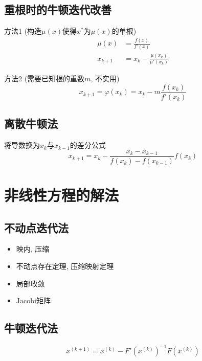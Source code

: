 \documentclass[twoside]{article}
\begin{document}
\subsection{重根时的牛顿迭代改善}
方法1 (构造$\mu(x)$使得$x^*$为$\mu(x)$的单根)
\begin{equation*}
  \begin{aligned}
    \mu(x) &= \frac{f(x)}{f'(x)} \\
    x_{k+1} &= x_k - \frac{\mu(x_k)}{\mu'(x_k)}
  \end{aligned}
\end{equation*}

方法2 (需要已知根的重数$m$, 不实用)
\begin{equation*}
  x_{k+1} = \varphi(x_k) = x_k - m \frac{f(x_k)}{f'(x_k)}
\end{equation*}

\subsection{离散牛顿法}
将导数换为$x_k$与$x_{k-1}$的差分公式
\begin{equation*}
  x_{k+1} = x_k - \frac{x_k - x_{k-1}}{f(x_k) - f(x_{k-1})} f(x_k)
\end{equation*}

\section{非线性方程的解法}\label{sec:fei_xian_xin_fang_chen_de_jie_fa_}
\subsection{不动点迭代法}
\begin{itemize}
  \item 映内, 压缩
  \item 不动点存在定理, 压缩映射定理
  \item 局部收敛
  \item Jacobi矩阵
\end{itemize}

\subsection{牛顿迭代法}
\begin{equation*}
  x^{(k+1)} = x^{(k)} - F'(x^{(k)})^{-1} F(x^{(k)})
\end{equation*}
\end{document}
